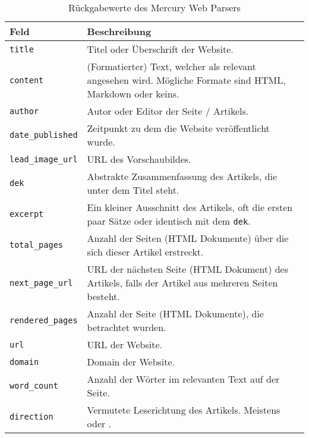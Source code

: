 \begin{table}
	\centering
	\begin{tabu}{lX}
		\toprule
		Feld & Beschreibung \\ \midrule
		\texttt{title} & Titel oder Überschrift der Website. \\
		\texttt{content} & (Formatierter) Text, welcher als relevant angesehen wird. Mögliche Formate sind HTML, Markdown oder keins. \\
		\texttt{author} & Autor oder Editor der Seite / Artikels. \\
		\texttt{date\_published} & Zeitpunkt zu dem die Website veröffentlicht wurde. \\
		\texttt{lead\_image\_url} & URL des Vorschaubildes.  \\
		\texttt{dek} & Abstrakte Zusammenfassung des Artikels, die unter dem Titel steht. \\
		\texttt{excerpt} & Ein kleiner Ausschnitt des Artikels, oft die ersten paar Sätze oder identisch mit dem \texttt{dek}. \\
		\texttt{total\_pages} & Anzahl der Seiten (HTML Dokumente) über die sich dieser Artikel erstreckt.\\
		\texttt{next\_page\_url} & URL der nächsten Seite (HTML Dokument) des Artikels, falls der Artikel aus mehreren Seiten besteht. \\
		\texttt{rendered\_pages} & Anzahl der Seite (HTML Dokumente), die betrachtet wurden. \\
		\texttt{url} & URL der Website. \\
		\texttt{domain} & Domain der Website. \\
		\texttt{word\_count} & Anzahl der Wörter im relevanten Text auf der Seite. \\
		\texttt{direction} & Vermutete Leserichtung des Artikels. Meistens  oder . \\ \bottomrule
		
	\end{tabu}
\caption{Rückgabewerte des Mercury Web Parsers}
\label{extractor:table:mercury}
\end{table}

